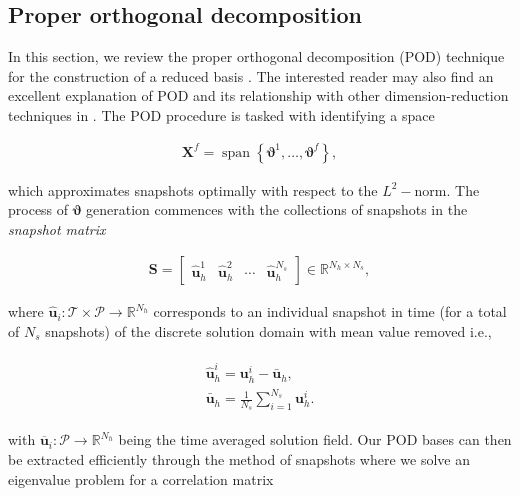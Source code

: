 \documentclass[preprint,12pt]{elsarticle}
\begin{document}
\subsection{Proper orthogonal decomposition}

In this section, we review the proper orthogonal decomposition (POD) technique for the construction of a reduced basis \cite{kosambi1943statistics,berkooz1993proper}. The interested reader may also find an excellent explanation of POD and its relationship with other dimension-reduction techniques in \cite{taira2019modal}. The POD procedure is tasked with identifying a space
\begin{linenomath*}
\begin{align}
\mathbf{X}^{f}=\operatorname{span}\left\{\boldsymbol{\vartheta}^{1}, \dots, \boldsymbol{\vartheta}^{f}\right\},
\end{align}
\end{linenomath*}
which approximates snapshots optimally with respect to the $L^2-$norm. The process of $\boldsymbol{\vartheta}$ generation commences with the collections of snapshots in the \emph{snapshot matrix}
\begin{linenomath*}
\begin{align}
\mathbf{S} = [\begin{array}{c|c|c|c}{\hat{\mathbf{u}}^{1}_h} & {\hat{\mathbf{u}}^{2}_h} & {\cdots} & {\hat{\mathbf{u}}^{N_{s}}_h}\end{array}] \in \mathbb{R}^{N_{h} \times N_{s}},
\end{align}
\end{linenomath*}
where $\hat{\mathbf{u}}_i : \mathcal{T} \times \mathcal{P} \rightarrow \mathbb{R}^{N_h}$ corresponds to an individual snapshot in time (for a total of $N_s$ snapshots) of the discrete solution domain with mean value removed i.e.,
\begin{linenomath*}
\begin{align}
\begin{gathered}
\hat{\mathbf{u}}^i_h = \mathbf{u}^i_h - \mathbf{\bar{u}}_h, \\
\mathbf{\bar{u}}_h = \frac{1}{N_s} \sum_{i=1}^{N_s} \mathbf{u}^i_h.
\end{gathered}
\end{align}
\end{linenomath*}
with $\overline{\mathbf{u}}_i : \mathcal{P} \rightarrow \mathbb{R}^{N_h}$ being the time averaged solution field. Our POD bases can then be extracted efficiently through the method of snapshots where we solve an eigenvalue problem for a correlation matrix
\end{document}
